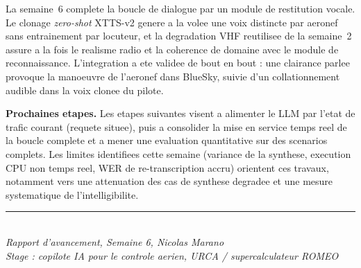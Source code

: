 \documentclass[11pt,a4paper]{article}
\begin{document}
La semaine~6 complete la boucle de dialogue par un module de restitution vocale.
Le clonage \emph{zero-shot} XTTS-v2 genere a la volee une voix distincte par aeronef
sans entrainement par locuteur, et la degradation VHF reutilisee de la semaine~2
assure a la fois le realisme radio et la coherence de domaine avec le module de
reconnaissance. L'integration a ete validee de bout en bout : une clairance parlee
provoque la manoeuvre de l'aeronef dans BlueSky, suivie d'un collationnement
audible dans la voix clonee du pilote.

\medskip
\noindent\textbf{Prochaines etapes.} Les etapes suivantes visent a alimenter le LLM
par l'etat de trafic courant (requete situee), puis a consolider la mise en service
temps reel de la boucle complete et a mener une evaluation quantitative sur des
scenarios complets. Les limites identifiees cette semaine (variance de la synthese,
execution CPU non temps reel, WER de re-transcription accru) orientent ces travaux,
notamment vers une attenuation des cas de synthese degradee et une mesure
systematique de l'intelligibilite.

\vfill
\begin{center}
\small\color{atcblue}\rule{0.5\textwidth}{0.6pt}\\[4pt]
\textit{Rapport d'avancement, Semaine 6, Nicolas Marano}\\
\textit{Stage : copilote IA pour le controle aerien, URCA / supercalculateur ROMEO}
\end{center}
\end{document}
